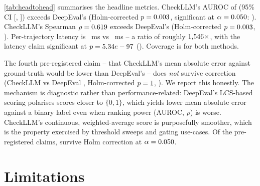 \documentclass{article}
\begin{document}
\autoref{tab:headtohead} summarises the headline metrics. CheckLLM's
AUROC of \CheckLLMAuroc{} (95\% CI [\CheckLLMAurocCiLow{},
\CheckLLMAurocCiHigh{}]) exceeds DeepEval's \DeepEvalAuroc{}
(Holm-corrected $p=0.003{}$, significant at
$\alpha=0.050{}$: \AurocClaimSignificant{}). CheckLLM's Spearman
$\rho=0.619{}$ exceeds DeepEval's \DeepEvalSpearman{}
(Holm-corrected $p=0.003{}$,
\SpearmanClaimSignificant{}). Per-trajectory latency is
\CheckLLMLatency{}~ms vs \DeepEvalLatency{}~ms -- a ratio of
roughly $1{,}546{}\times$, with the latency
claim significant at $p=5.34e-97{}$
(\LatencyClaimSignificant{}). Coverage is \CheckLLMCoverage{} for
both methods.

The fourth pre-registered claim -- that CheckLLM's mean absolute
error against ground-truth would be lower than DeepEval's -- does
\emph{not} survive correction (CheckLLM \CheckLLMMae{} vs DeepEval
\DeepEvalMae{}, Holm-corrected $p=1{}$,
\MaeClaimSignificant{}). We report this honestly. The mechanism is
diagnostic rather than performance-related: DeepEval's LCS-based
scoring polarises scores closer to $\{0,1\}$, which yields lower mean
absolute error against a binary label even when ranking power
(AUROC, $\rho$) is worse. CheckLLM's continuous, weighted-average
score is purposefully smoother, which is the property exercised by
threshold sweeps and gating use-cases. Of the \HHClaimsCount{}
pre-registered claims, \HHClaimsSignificant{} survive Holm correction
at $\alpha=0.050{}$.

\begin{table}[t]
  \centering
  \caption{Head-to-head against DeepEval~\DeepEvalVersion{} on
  \HHNTrajectories{} matched trajectories. CIs are 95\% percentile
  bootstraps with $B=\HHNBootstrap{}$.}
  \label{tab:headtohead}
  \TableHeadToHead
\end{table}

\section{Limitations}
\label{sec:limitations}
\end{document}
